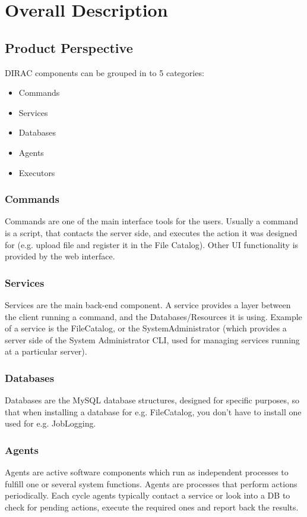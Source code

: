 \documentclass{scrreprt}
\begin{document}
\chapter{Overall Description}
\section{Product Perspective}
DIRAC components can be grouped in to 5 categories: 
\begin{itemize}
\item Commands
\item Services
\item Databases
\item Agents
\item Executors
\end{itemize}

\subsection{Commands}
Commands are one of the main interface tools for the users. Usually a command is a script, that contacts the server side, and executes the action it was designed for (e.g. upload file and register it in the File Catalog). Other UI functionality is provided by the web interface.

\subsection{Services}
Services are the main back-end component. A service provides a layer between the client running a command, and the Databases/Resources it is using. Example of a service is the FileCatalog, or the SystemAdministrator (which provides a server side of the System Administrator CLI, used for managing services running at a particular server).

\subsection{Databases}
Databases are the MySQL database structures, designed for specific purposes, so that when installing a database for e.g. FileCatalog, you don't have to install one used for e.g. JobLogging.

\subsection{Agents}
Agents are active software components which run as independent processes to fulfill one or several system functions. Agents are processes that perform actions periodically. Each cycle agents typically contact a service or look into a DB to check for pending actions, execute the required ones and report back the results. 
\end{document}

